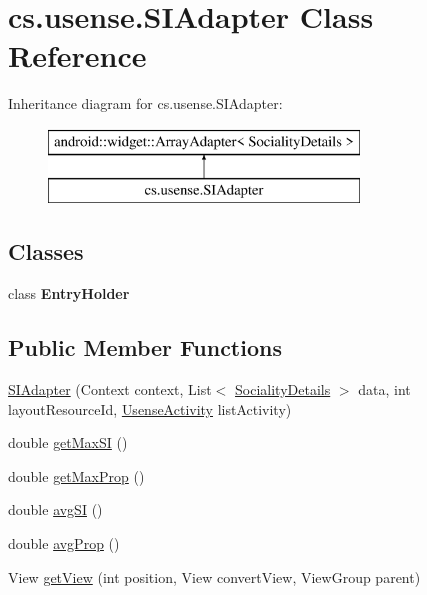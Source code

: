 \hypertarget{classcs_1_1usense_1_1_s_i_adapter}{}\section{cs.\+usense.\+S\+I\+Adapter Class Reference}
\label{classcs_1_1usense_1_1_s_i_adapter}
Inheritance diagram for cs.\+usense.\+S\+I\+Adapter\+:\begin{figure}[H]
\begin{center}
\leavevmode
\includegraphics[height=2.000000cm]{classcs_1_1usense_1_1_s_i_adapter}
\end{center}
\end{figure}
\subsection*{Classes}
\begin{DoxyCompactItemize}
\item 
class {\bfseries Entry\+Holder}
\end{DoxyCompactItemize}
\subsection*{Public Member Functions}
\begin{DoxyCompactItemize}
\item 
\hyperlink{classcs_1_1usense_1_1_s_i_adapter_aeb7cda41e2c8832b3d9f6b5698fedbf3}{S\+I\+Adapter} (Context context, List$<$ \hyperlink{classcs_1_1usense_1_1inference_module_1_1_sociality_details}{Sociality\+Details} $>$ data, int layout\+Resource\+Id, \hyperlink{classcs_1_1usense_1_1_usense_activity}{Usense\+Activity} list\+Activity)
\item 
double \hyperlink{classcs_1_1usense_1_1_s_i_adapter_a20e191304ac29f0c09d3c810cb700638}{get\+Max\+S\+I} ()
\item 
double \hyperlink{classcs_1_1usense_1_1_s_i_adapter_ae803af9aefa934570ddb0f030601ecc4}{get\+Max\+Prop} ()
\item 
double \hyperlink{classcs_1_1usense_1_1_s_i_adapter_ac1bf483080fd3c6cb9e1e5c7612d3b15}{avg\+S\+I} ()
\item 
double \hyperlink{classcs_1_1usense_1_1_s_i_adapter_af348ad48189c6c162c9623839e5f2b87}{avg\+Prop} ()
\item 
View \hyperlink{classcs_1_1usense_1_1_s_i_adapter_a13379dd4f9b3f16eb047db7b6e4b63c0}{get\+View} (int position, View convert\+View, View\+Group parent)
\end{DoxyCompactItemize}
